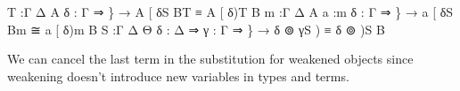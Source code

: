 \documentclass{acm_proc_article-sp}
\begin{document}
\begin{code}%
\>\AgdaFunction{
[+S]}T   :\AgdaBound{\{}Γ Δ A \AgdaBound{\{}δ : Γ ⇒ \}
        → A [ δ\AgdaFunction{ +}S B\AgdaFunction{ ]}T ≡ \AgdaBound{(}A [ δ\AgdaFunction{ ]})\AgdaFunction{ +}T B 
m  :\AgdaBound{\{}Γ Δ A \AgdaBound{(}a :m \AgdaBound{\{}δ : Γ ⇒ \}
        → a [ δ\AgdaFunction{ +}S B\AgdaFunction{ ]t}m ≅ \AgdaBound{(}a [ δ\AgdaFunction{ ]t})m B
\AgdaFunction{
[+S]}S   :\AgdaBound{\{}Γ Δ Θ \AgdaBound{\{}δ : Δ ⇒ \AgdaBound{\{}γ : Γ ⇒ \}
        → δ ⊚ \AgdaBound{(}γ\AgdaFunction{ +}S ) ≡ \AgdaBound{(}δ ⊚ )\AgdaFunction{ +}S B
\<%
\end{code}
We can cancel the last term in the substitution for weakened objects
since weakening doesn't introduce new variables in types and terms.
\end{document}
